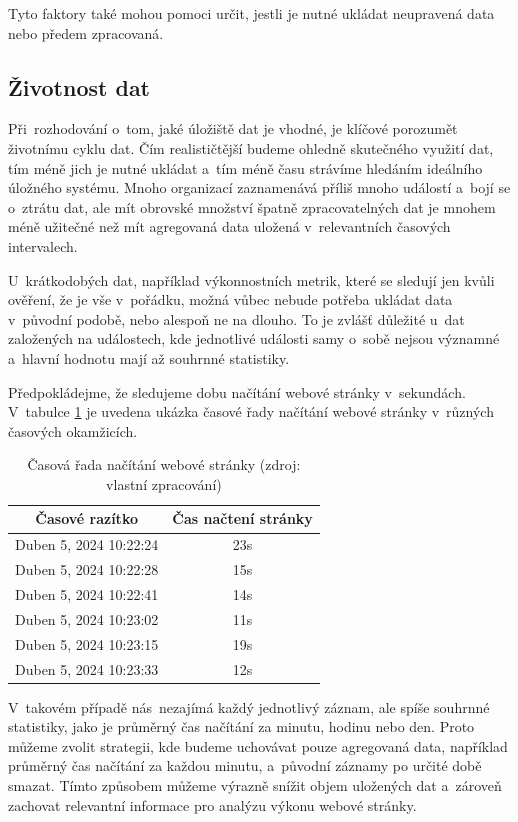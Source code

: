 Tyto faktory také mohou pomoci určit, jestli je nutné ukládat neupravená data nebo předem zpracovaná.

\subsection{Životnost dat}
Při~rozhodování o~tom, jaké úložiště dat je vhodné, je klíčové porozumět životnímu cyklu dat. 
Čím realističtější budeme ohledně skutečného využití dat, tím méně jich je nutné ukládat a~tím méně času strávíme hledáním ideálního úložného systému. 
Mnoho organizací zaznamenává příliš mnoho událostí a~bojí se o~ztrátu dat, ale mít obrovské množství špatně zpracovatelných dat 
je mnohem méně užitečné než mít agregovaná data uložená v~relevantních časových intervalech.

U~krátkodobých dat, například výkonnostních metrik, které se sledují jen kvůli ověření, že je vše v~pořádku, možná vůbec nebude 
potřeba ukládat data v~původní podobě, nebo alespoň ne na dlouho. To je zvlášť důležité u~dat založených na událostech, kde jednotlivé 
události samy o~sobě nejsou významné a~hlavní hodnotu mají až souhrnné statistiky. \cite{nielsen2019practical}

Předpokládejme, že sledujeme dobu načítání webové stránky v~sekundách.
V~tabulce \ref{table:1} je uvedena ukázka časové řady načítání webové stránky v~různých časových okamžicích.
\begin{table}[ht!]
\centering
\begin{tabular}{||c | c||} 
    \hline
    \textbf{Časové razítko} & \textbf{Čas načtení stránky} \\ [0.5ex] 
    \hline\hline
    Duben 5, 2024 10:22:24 & 23s \\ 
    \hline
    Duben 5, 2024 10:22:28 & 15s \\
    \hline
    Duben 5, 2024 10:22:41 & 14s \\
    \hline
    Duben 5, 2024 10:23:02 & 11s \\
    \hline
    Duben 5, 2024 10:23:15 & 19s \\
    \hline
    Duben 5, 2024 10:23:33 & 12s \\
    \hline
\end{tabular}
\caption{Časová řada načítání webové stránky (zdroj: vlastní zpracování)}
\label{table:1}
\end{table}

V~takovém případě nás~nezajímá každý jednotlivý záznam, ale spíše souhrnné statistiky, jako je průměrný čas načítání za minutu, hodinu nebo den.
Proto můžeme zvolit strategii, kde budeme uchovávat pouze agregovaná data, například průměrný čas načítání za každou minutu, a~původní záznamy po určité době smazat.
Tímto způsobem můžeme výrazně snížit objem uložených dat a~zároveň zachovat relevantní informace pro analýzu výkonu webové stránky. \cite{nielsen2019practical}

